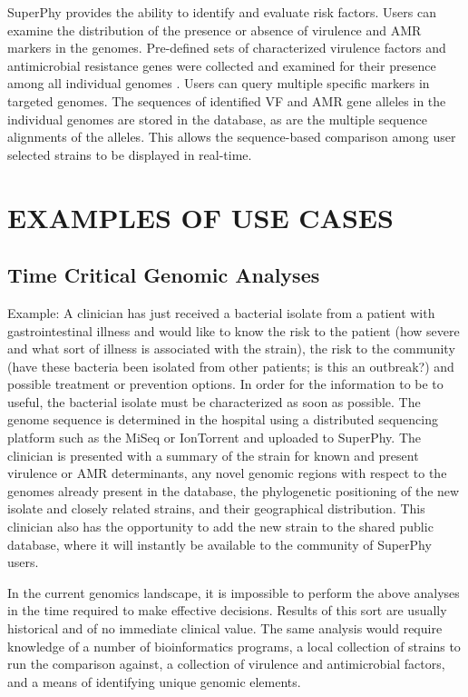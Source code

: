 \documentclass[a4paper,twoside]{article}
\begin{document}
SuperPhy provides the ability to identify and evaluate risk factors. Users can examine the distribution of the presence or absence of virulence and AMR markers in the genomes.  Pre-defined sets of characterized virulence factors and antimicrobial resistance genes were collected and examined for their presence among all individual genomes \cite{mcarthur2012card,chen2012vfdb,chen2005vfdb}. Users can query multiple specific markers in targeted genomes. The sequences of identified VF and AMR gene alleles in the individual genomes are stored in the database, as are the multiple sequence alignments of the alleles. This allows the sequence-based comparison among user selected strains to be displayed in real-time. 

\section{\uppercase{Examples of Use Cases}}
\label{sec:cases}
\subsection{Time Critical Genomic Analyses}
Example: A clinician has just received a bacterial isolate from a patient with gastrointestinal illness and would like to know the risk to the patient (how severe and what sort of illness is associated with the strain), the risk to the community (have these bacteria been isolated from other patients; is this an outbreak?) and possible treatment or prevention options. In order for the information to be to useful, the bacterial isolate must be characterized as soon as possible. The genome sequence is determined in the hospital using a distributed sequencing platform such as the MiSeq or IonTorrent and uploaded to SuperPhy. The clinician is presented with a summary of the strain for known and present virulence or AMR determinants, any novel genomic regions with respect to the genomes already present in the database, the phylogenetic positioning of the new isolate and closely related strains, and their geographical distribution. This clinician also has the opportunity to add the new strain to the shared public database, where it will instantly be available to the community of SuperPhy users.

In the current genomics landscape, it is impossible to perform the above analyses in the time required to make effective decisions. Results of this sort are usually historical and of no immediate clinical value. The same analysis would require knowledge of a number of bioinformatics programs, a local collection of strains to run the comparison against, a collection of virulence and antimicrobial factors, and a means of identifying unique genomic elements.
\end{document}
